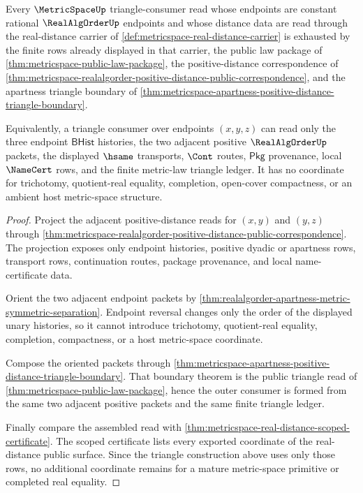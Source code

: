 \begin{theorem}
\label{thm:metricspace-realalgorder-triangle-consumer-exhaustion}
Every $\MetricSpaceUp$ triangle-consumer read whose endpoints are constant
rational $\RealAlgOrderUp$ endpoints and whose distance data are read through
the real-distance carrier of
\autoref{def:metricspace-real-distance-carrier} is exhausted by the finite
rows already displayed in that carrier, the public law package of
\autoref{thm:metricspace-public-law-package}, the positive-distance
correspondence of
\autoref{thm:metricspace-realalgorder-positive-distance-public-correspondence},
and the apartness triangle boundary of
\autoref{thm:metricspace-apartness-positive-distance-triangle-boundary}.

Equivalently, a triangle consumer over endpoints $(x,y,z)$ can read only the
three endpoint $\mathsf{BHist}$ histories, the two adjacent positive
$\RealAlgOrderUp$ packets, the displayed $\hsame$ transports, $\Cont$ routes,
$\mathsf{Pkg}$ provenance, local $\NameCert$ rows, and the finite metric-law
triangle ledger. It has no coordinate for trichotomy, quotient-real equality,
completion, open-cover compactness, or an ambient host metric-space
structure.
\end{theorem}
\begin{proof}
Project the adjacent positive-distance reads for $(x,y)$ and $(y,z)$ through
\autoref{thm:metricspace-realalgorder-positive-distance-public-correspondence}.
The projection exposes only endpoint histories, positive dyadic or apartness
rows, transport rows, continuation routes, package provenance, and local
name-certificate data.

Orient the two adjacent endpoint packets by
\autoref{thm:realalgorder-apartness-metric-symmetric-separation}. Endpoint
reversal changes only the order of the displayed unary histories, so it cannot
introduce trichotomy, quotient-real equality, completion, compactness, or a
host metric-space coordinate.

Compose the oriented packets through
\autoref{thm:metricspace-apartness-positive-distance-triangle-boundary}. That
boundary theorem is the public triangle read of
\autoref{thm:metricspace-public-law-package}, hence the outer consumer is
formed from the same two adjacent positive packets and the same finite
triangle ledger.

Finally compare the assembled read with
\autoref{thm:metricspace-real-distance-scoped-certificate}. The scoped
certificate lists every exported coordinate of the real-distance public
surface. Since the triangle construction above uses only those rows, no
additional coordinate remains for a mature metric-space primitive or completed
real equality.
\end{proof}


